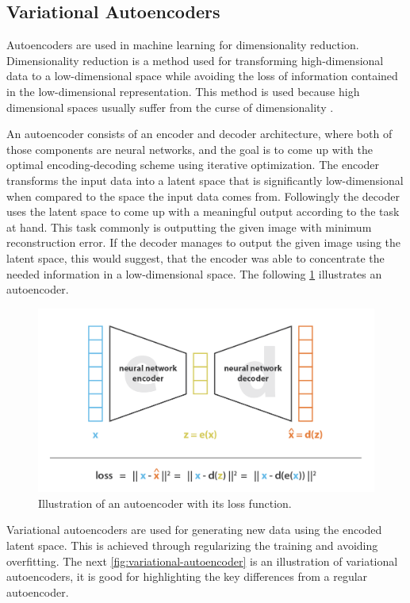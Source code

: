 \documentclass[conference]{IEEEtran}
\begin{document}
\subsection{Variational Autoencoders}
Autoencoders are used in machine learning for dimensionality reduction. Dimensionality reduction is a method used for transforming high-dimensional data to a low-dimensional space while avoiding the loss of information contained in the low-dimensional representation. This method is used because high dimensional spaces usually suffer from the curse of dimensionality \cite{Curse_of_Dimensionality}. 

An autoencoder consists of an encoder and decoder architecture, where both of those components are neural networks, and the goal is to come up with the optimal encoding-decoding scheme using iterative optimization. The encoder transforms the input data into a latent space that is significantly low-dimensional when compared to the space the input data comes from. Followingly the decoder uses the latent space to come up with a meaningful output according to the task at hand. This task commonly is outputting the given image with minimum reconstruction error. If the decoder manages to output the given image using the latent space, this would suggest, that the encoder was able to concentrate the needed information in a low-dimensional space. The following \figurename \ref{fig:autoencoder} illustrates an autoencoder. 

\begin{figure}[!t]
  \centering
  \includegraphics[width=1.0\linewidth]{images/autoencoder.png}
  \caption{Illustration of an autoencoder with its loss function.
}
\label{fig:autoencoder}
\end{figure}

Variational autoencoders are used for generating new data using the encoded latent space. This is achieved through regularizing the training and avoiding overfitting. The next \figurename \ref{fig:variational-autoencoder} is an illustration of variational autoencoders, it is good for highlighting the key differences from a regular autoencoder.
\end{document}

